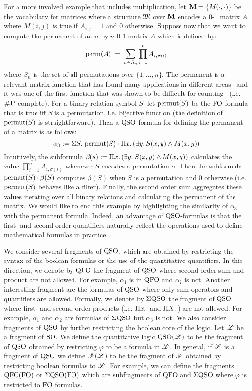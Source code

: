 \begin{example}
For a more involved example that includes multiplication, let $\mathbf{M} = \{M(\cdot,\cdot)\}$ be the vocabulary for matrices where a structure $\mathfrak{M}$ over $\mathbf{M}$ encodes a 0-1 matrix $A$ where $M(i,j)$ is true if $A_{i,j} = 1$ and $0$ otherwise. 
Suppose now that we want to compute the permanent of an $n$-by-$n$ 0-1 matrix $A$ which is defined by:
$$
\operatorname{perm}(A) \; = \; \sum_{\sigma \in S_n} \prod_{i=1}^n A_{i, \sigma(i)}  
$$
where $S_n$ is the set of all permutations over $\{1, \ldots, n\}$.
The permanent is a relevant matrix function that has found many applications in different areas~\cite{permanent-applications} and it was one of the first function that was shown to be difficult for counting~\cite{Valiant79} (i.e. $\text{\sc \#P}$-complete). 
For a binary relation symbol $S$, let $\operatorname{permut}(S)$ be the ${\rm FO}$-formula that is true iff $S$ is a permutation, i.e. bijective function (the definition of $\operatorname{permut}(S)$ is straightforward).
Then a ${\rm QSO}$-formula for defining the permanent of a matrix is as follows:
\[
\alpha_3 := \Sigma{S}.\, \operatorname{permut}(S) \cdot \Pi{x}.\, (\exists{y}.\: S(x,y) \wedge M(x,y))
\]
Intuitively, the subformula $\beta(s) := \Pi{x}.\, (\exists{y}.\: S(x,y) \wedge M(x,y))$ calculates the value $\prod_{i=1}^n A_{i, \sigma(i)}$ whenever $S$ encodes a permutation $\sigma$.
Then the subformula $\operatorname{permut}(S) \cdot \beta(S)$ computes $\beta(S)$ when $S$ is a permutation and $0$ otherwise (i.e. $\operatorname{permut}(S)$ behaves like a filter). 
Finally, the second order sum aggregates these values iterating over all binary relations and calculating the permanent of the matrix.
We would like to end this example by highlighting the similarity of $\alpha_3$ with the permanent formula. 
Indeed, an advantage of ${\rm QSO}$-formulas is that the first- and second-order quantifiers naturally reflect the operations used to define mathematical formulas in practice.
\end{example}

We consider several fragments of ${\rm QSO}$, which are obtained by restricting the syntax of the boolean formulas or the use of the quantitative quantifiers.
In this direction, we denote by ${\rm QFO}$ the fragment of ${\rm QSO}$ where second-order sum and product are not allowed. 
For example, $\alpha_1$ is in ${\rm QFO}$ and $\alpha_2$ is not.
Another interesting fragment are the formulas of ${\rm QSO}$ where only sum operators and quantifiers are allowed. 
Formally, we denote by $\Sigma{\rm QSO}$ the fragment of ${\rm QSO}$ where first- and second-order products (i.e. $\Pi{x}.\,$ and $\Pi{X}.\,$) are not allowed.
For example, $\alpha_1$ and $\alpha_2$ are formulas of $\Sigma{\rm QSO}$ but $\alpha_3$ is not. 
We also consider fragments of ${\rm QSO}$ by further restricting the boolean core of the logic.
Let $\mathscr{L}$ be a fragment of ${\rm SO}$.
We define the quantitative logic ${\rm QSO}(\mathscr{L})$ to be the fragment of ${\rm QSO}$ obtained by restricting $\varphi$ to be a formula in $\mathscr{L}$. 
In general, if $\mathscr{F}$ is a fragment of ${\rm QSO}$ we define $\mathscr{F}(\mathscr{L})$ to be the fragment of $\mathscr{F}$ obtained by restricting boolean formulas to $\mathscr{L}$.
For example, we can define the fragments ${\rm QFO}({\rm FO})$ or $\Sigma{\rm QSO}({\rm FO})$ which are subfragments of ${\rm QFO}$ and $\Sigma{\rm QSO}$ where $\varphi$ is restricted to ${\rm FO}$ formulas. 

